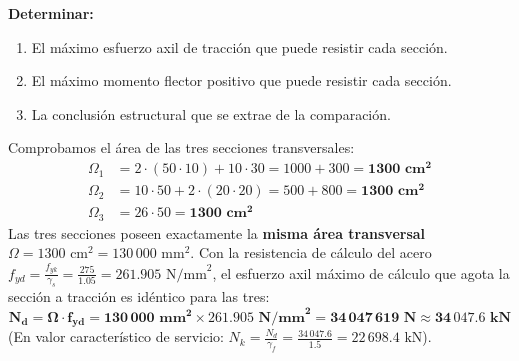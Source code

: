 {    \textbf{Determinar:}
    \begin{enumerate}[label=\alph*)]
        \item El máximo esfuerzo axil de tracción que puede resistir cada sección.
        \item El máximo momento flector positivo que puede resistir cada sección.
        \item La conclusión estructural que se extrae de la comparación.
    \end{enumerate}

    \tcblower


    Comprobamos el área de las tres secciones transversales:
    \begin{align}
        \Omega_1 & = 2 \cdot (50 \cdot 10) + 10 \cdot 30 = 1000 + 300 = \mathbf{1300\text{ cm}^2} \\
        \Omega_2 & = 10 \cdot 50 + 2 \cdot (20 \cdot 20) = 500 + 800 = \mathbf{1300\text{ cm}^2}  \\
        \Omega_3 & = 26 \cdot 50 = \mathbf{1300\text{ cm}^2}
    \end{align}
    Las tres secciones poseen exactamente la \textbf{misma área transversal} $\Omega = 1300\text{ cm}^2 = 130\,000\text{ mm}^2$.
    Con la resistencia de cálculo del acero $f_{yd} = \frac{f_{yk}}{\gamma_s} = \frac{275}{1.05} = 261.905\text{ N/mm}^2$, el esfuerzo axil máximo de cálculo que agota la sección a tracción es idéntico para las tres:
    \begin{equation}
        \mathbf{N_d = \Omega \cdot f_{yd} = 130\,000\text{ mm}^2 \times 261.905\text{ N/mm}^2 = 34\,047\,619\text{ N} \approx 34\,047.6\text{ kN}}
    \end{equation}
    (En valor característico de servicio: $N_k = \frac{N_d}{\gamma_f} = \frac{34\,047.6}{1.5} = 22\,698.4\text{ kN}$).


}
